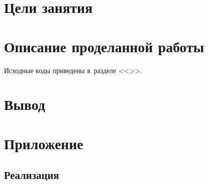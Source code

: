 

\graphicspath{{./images/}}







  
  \setcounter{page}{2}

  \tableofcontents
  \newpage

  \section{Цели занятия}

  \section{Описание проделанной работы}

    Исходные коды приведены в~разделе <<>>.

  \section{Вывод}

  \newpage
  \nocite{*}
  \printbibliography

  \newpage
  \section{Приложение} \label{sec:addon}

    \subsection{Реализация}



